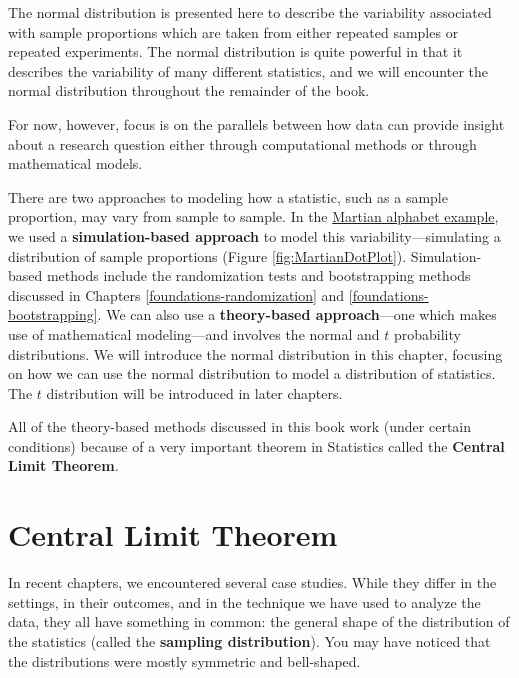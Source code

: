 \documentclass[
  10pt,
  openany]{book}
\theoremstyle{definition}
\theoremstyle{definition}
\theoremstyle{definition}
\theoremstyle{definition}
\theoremstyle{remark}
\begin{document}
The normal distribution is presented here to describe the variability associated with sample proportions which are taken from either repeated samples or repeated experiments.
The normal distribution is quite powerful in that it describes the variability of many different statistics, and we will encounter the normal distribution throughout the remainder of the book.

For now, however, focus is on the parallels between how data can provide insight about a research question either through computational methods or through mathematical models.

There are two approaches to modeling how a statistic, such as a sample proportion, may vary from sample to sample.
In the \hyperref[Martian]{Martian alphabet example}, we used a \textbf{simulation-based approach} to model this variability---simulating a distribution of sample proportions (Figure \ref{fig:MartianDotPlot}). Simulation-based methods include the randomization tests and bootstrapping methods discussed in Chapters \ref{foundations-randomization} and \ref{foundations-bootstrapping}. We can also use a \textbf{theory-based approach}---one which makes use of mathematical modeling---and involves the normal and \(t\) probability distributions.
We will introduce the normal distribution in this chapter, focusing on how we can use the normal distribution to model a distribution of statistics. The \(t\) distribution will be introduced in later chapters.

All of the theory-based methods discussed in this book work (under certain conditions) because of a very important theorem in Statistics called the \textbf{Central Limit Theorem}.

\section{Central Limit Theorem}\label{CLTsection}

In recent chapters, we encountered several case studies.
While they differ in the settings, in their outcomes, and in the technique we have used to analyze the data, they all have something in common: the general shape of the distribution of the statistics (called the \textbf{sampling distribution}). You may have noticed that the distributions were mostly symmetric and bell-shaped.
\end{document}
